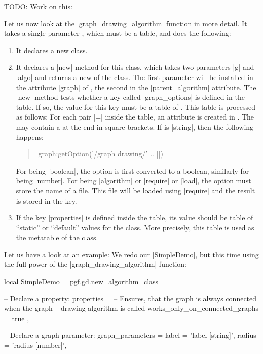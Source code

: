 TODO: Work on this:

Let us now look at the |graph_drawing_algorithm| function in more
detail. It takes a single parameter , which must be a
table, and does the following:

\begin{enumerate}
\item It declares a new class.
\item It declares a |new| method for this class, which takes two
  parameters |g| and |algo| and returns a new  of the
  class. The first parameter will be installed in the attribute
  |graph| of , the second in the |parent_algorithm|
  attribute. The |new| method tests whether a key called 
  |graph_options| is defined in the  table. If so, the
  value for this key must be a table of . This table is
  processed as follows: For each pair  |=| 
  inside the  table, an attribute  is created
  in . The  may contain a  at
  the end in square brackets. If  is |string|, then the
  following happens:
  \begin{quote}
    |graph:getOption('/graph drawing/' .. ||)|
  \end{quote}
  For  being |boolean|, the option is first converted to a
  boolean, similarly for  being |number|. For 
  being |algorithm| or |require| or |load|, the option must store the
  name of a file. This file will be loaded using |require| and the
  result is stored in the key.
\item If the key |properties| is defined inside the  table,
  its value should be table of ``static'' or ``default'' values for
  the class. More precisely, this table is used as the metatable of
  the class.
\end{enumerate}

Let us have a look at an example: We redo our |SimpleDemo|, but this
time using the full power of the |graph_drawing_algorithm| function:

\begin{codeexample}
local SimpleDemo = pgf.gd.new_algorithm_class = {
  
  -- Declare a property:
  properties = {
    -- Ensures, that the graph is always connected when the graph
    -- drawing algorithm is called
    works_only_on_connected_graphs = true
  },

  -- Declare a graph parameter:
  graph_parameters = {
    label  = 'label [string]',
    radius = 'radius [number]',
  }
}
\end{codeexample}


